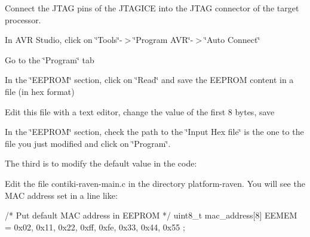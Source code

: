 \begin{DoxyItemize}
\item \-Connect the \-J\-T\-A\-G pins of the \-J\-T\-A\-G\-I\-C\-E into the \-J\-T\-A\-G connector of the target processor. \item \-In \-A\-V\-R \-Studio, click on \char`\"{}\-Tools\char`\"{}-\/$>$\char`\"{}\-Program A\-V\-R\char`\"{}-\/$>$\char`\"{}\-Auto Connect\char`\"{} \item \-Go to the \char`\"{}\-Program\char`\"{} tab \item \-In the \char`\"{}\-E\-E\-P\-R\-O\-M\char`\"{} section, click on \char`\"{}\-Read\char`\"{} and save the \-E\-E\-P\-R\-O\-M content in a file (in hex format) \item \-Edit this file with a text editor, change the value of the first 8 bytes, save \item \-In the \char`\"{}\-E\-E\-P\-R\-O\-M\char`\"{} section, check the path to the \char`\"{}\-Input Hex file\char`\"{} is the one to the file you just modified and click on \char`\"{}\-Program\char`\"{}.\end{DoxyItemize}
\-The third is to modify the default value in the code\-:

\begin{DoxyItemize}
\item \-Edit the file contiki-\/raven-\/main.\-c in the directory platform-\/raven. \-You will see the \-M\-A\-C address set in a line like\-:\end{DoxyItemize}

\begin{DoxyCode}
/* Put default MAC address in EEPROM */
uint8_t mac_address[8] EEMEM = {0x02, 0x11, 0x22, 0xff, 0xfe, 0x33, 0x44, 0x55}
      ;
\end{DoxyCode}


